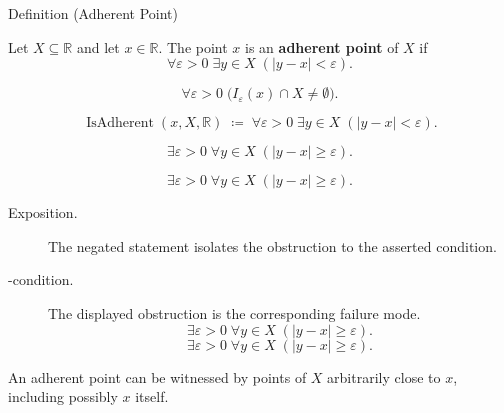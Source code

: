 \begin{definitionbox}{Definition (Adherent Point)}
\begin{definition}
\label{def:adherent-point-r}
Let $X\subseteq\mathbb{R}$ and let $x\in\mathbb{R}$. The point $x$ is
an \textbf{adherent point} of $X$ if
\[
  \forall\varepsilon>0\;\exists y\in X\;(|y-x|<\varepsilon).
\]
\end{definition}
\end{definitionbox}

\begin{remark*}
\[
  \forall\varepsilon>0\;\bigl(I_\varepsilon(x)\cap X\neq\emptyset\bigr).
\]
\end{remark*}

\begin{remark*}
\[
  \operatorname{IsAdherent}(x,X,\mathbb{R})
  \;\coloneqq\;
  \forall\varepsilon>0\;\exists y\in X\;(|y-x|<\varepsilon).
\]
\end{remark*}

\begin{remark*}
\[
  \exists\varepsilon>0\;\forall y\in X\;(|y-x|\geq\varepsilon).
\]
\end{remark*}

\begin{remark*}
\[
  \exists\varepsilon>0\;\forall y\in X\;(|y-x|\geq\varepsilon).
\]
\end{remark*}

\begin{remark*}
\begin{description}
  \item[Exposition.]
  The negated statement isolates the obstruction to the asserted condition.

  \item[\exists-condition.]
  The displayed obstruction is the corresponding failure mode.
  \[
  \exists\varepsilon>0\;\forall y\in X\;(|y-x|\geq\varepsilon).
\]
  \[
  \exists\varepsilon>0\;\forall y\in X\;(|y-x|\geq\varepsilon).
\]
\end{description}
\end{remark*}



\begin{remark*}[Interpretation]
An adherent point can be witnessed by points of $X$ arbitrarily close to
$x$, including possibly $x$ itself.
\end{remark*}

